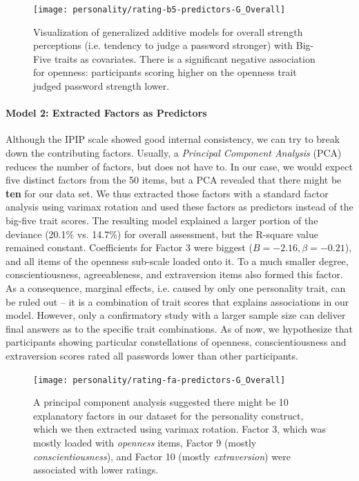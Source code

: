 \begin{figure}[htbp]
	\centering
	\texttt{[image: personality/rating-b5-predictors-G\_Overall]}
	\caption{\label{fig:personality:study2:rating-b5-predictors-G_Overall}Visualization of generalized additive models for overall strength perceptions (i.e. tendency to judge a password stronger) with Big-Five traits as covariates. There is a significant negative association for openness: participants scoring higher on the openness trait judged password strength lower.}
\end{figure}


\paragraph{Model 2: Extracted Factors as Predictors}
Although the IPIP scale showed good internal consistency, we can try to break down the contributing factors. Usually, a \textit{Principal Component Analysis} (PCA) reduces the number of factors, but does not have to. In our case, we would expect five distinct factors from the 50 items, but a PCA revealed that there might be \textbf{ten} for our data set. We thus extracted those factors with a standard factor analysis using varimax rotation and used these factors as predictors instead of the big-five trait scores. The resulting model explained a larger portion of the deviance (20.1\% vs. 14.7\%) for overall assessment, but the R-square value remained constant. Coefficients for Factor 3 were biggest ($B=-2.16, \beta=-0.21$), and all items of the openness sub-scale loaded onto it. To a much smaller degree, conscientiousness, agreeableness, and extraversion items also formed this factor. As a consequence, marginal effects, i.e. caused by only one personality trait, can be ruled out -- it is a combination of trait scores that explains associations in our model. However, only a confirmatory study with a larger sample size can deliver final answers as to the specific trait combinations. As of now, we hypothesize that participants showing particular constellations of openness, conscientiousness and extraversion scores rated all passwords lower than other participants.
\begin{figure}[htbp]
	\centering
	\texttt{[image: personality/rating-fa-predictors-G\_Overall]}
	\caption{\label{fig:personality:study2:rating-fa-predictors-G_Overall}A principal component analysis suggested there might be 10 explanatory factors in our dataset for the personality construct, which we then extracted using varimax rotation. Factor 3, which was mostly loaded with \textit{openness} items, Factor 9 (mostly \textit{conscientiousness}), and Factor 10 (mostly \textit{extraversion}) were associated with lower ratings.}
\end{figure}

